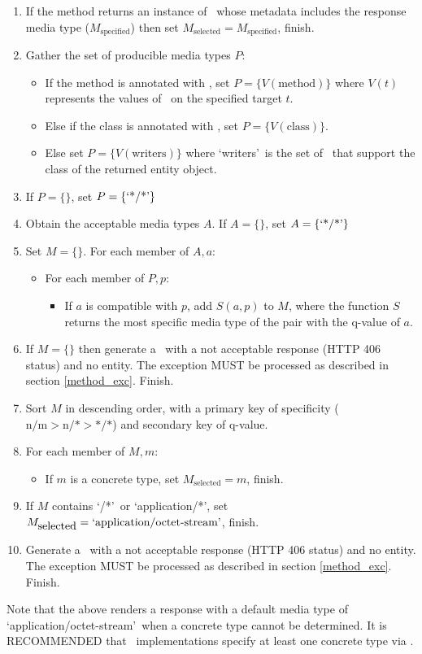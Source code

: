 \begin{enumerate}
\item If the method returns an instance of \Response\ whose metadata includes the response media type ($M_{\mbox{specified}}$) then set $M_{\mbox{selected}} = M_{\mbox{specified}}$, finish.
\item Gather the set of producible media types $P$:
\begin{itemize}
\item If the method is annotated with \Produces, set $P = \{ V(\mbox{method}) \}$ where $V(t)$ represents the values of \Produces\ on the specified target $t$.
\item Else if the class is annotated with \Produces, set $P = \{ V(\mbox{class}) \}$.
\item Else set $P = \{ V(\mbox{writers}) \}$ where \lq writers\rq\ is the set of \MsgWrite\ that support the class of the returned entity object.
\end{itemize}

\item If $P = \{\}$, set $P = \{\mbox{\lq*/*\rq}\}$

\item Obtain the acceptable media types $A$. If $A = \{\}$, set $A = \{\mbox{\lq*/*\rq}\}$

\item Set $M=\{\}$. For each member of $A, a$:
\begin{itemize}
\item For each member of $P, p$:
\begin{itemize}
\item If $a$ is compatible with $p$, add $S(a,p)$ to $M$, where the function $S$ returns the most specific media type of the pair with the q-value of $a$.
\end{itemize}
\end{itemize}

\item If $M = \{\}$ then generate a \WebAppExc\ with a not acceptable response (HTTP 406 status) and no entity. The exception MUST be processed as described in section \ref{method_exc}. Finish.

\item Sort $M$ in descending order, with a primary key of specificity ($\mbox{n/m} > \mbox{n/*} > \mbox{*/*}$)  and secondary key of q-value.

\item For each member of $M, m$:
\begin{itemize}
\item If $m$ is a concrete type, set $M_{\mbox{selected}} = m$, finish.
\end{itemize}

\item If $M$ contains \lq*/*\rq\ or \lq application/*\rq, set $M_{\mbox{selected}} = \mbox{\lq application/octet-stream\rq}$, finish.

\item Generate a \WebAppExc\ with a not acceptable response (HTTP 406 status) and no entity. The exception MUST be processed as described in section \ref{method_exc}. Finish.
\end{enumerate}

Note that the above renders a response with a default media type of \lq application/octet-stream\rq\ when a concrete type cannot be determined. It is RECOMMENDED that \MsgWrite\ implementations specify at least one concrete type via \Produces.